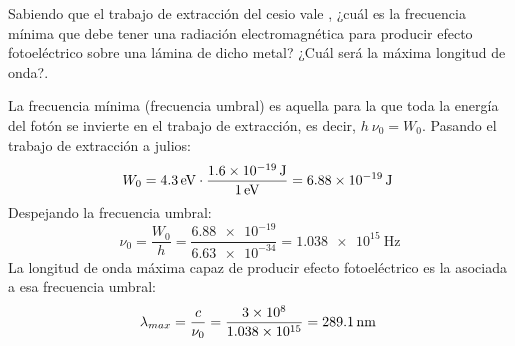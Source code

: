 \begin{exercise}
    Sabiendo que el trabajo de extracción del cesio vale , ¿cuál es la frecuencia mínima que debe tener una radiación electromagnética para producir efecto fotoeléctrico sobre una lámina de dicho metal?
    ¿Cuál será la máxima longitud de onda?.
    \begin{solu}
        La frecuencia mínima (frecuencia umbral) es aquella para la que toda la energía del fotón se invierte en el trabajo de extracción, es decir, \(h\ \nu_0 = W_0\). Pasando el trabajo de extracción a julios:
        \begin{equation*}
            W_0 = \SI{4.3}{\electronvolt}\cdot \dfrac{\SI{1.6e-19}{\joule}}{\SI{1}{\electronvolt}} = \energia[j]{6.88e-19}
        \end{equation*}
        Despejando la frecuencia umbral:
        \begin{equation*}
            \nu_0 = \dfrac{W_0}{h} = \dfrac{\num{6.88e-19}}{\num{6.63e-34}} = \SI{1.038e15}{\hertz}
        \end{equation*}
        La longitud de onda máxima capaz de producir efecto fotoeléctrico es la asociada a esa frecuencia umbral:
        \begin{equation*}
            \lambda_{max} = \dfrac{c}{\nu_0} = \dfrac{\num{3e8}}{\num{1.038e15}} = \distancia[nm]{289.1}
        \end{equation*}
    \end{solu}
\end{exercise}
%

